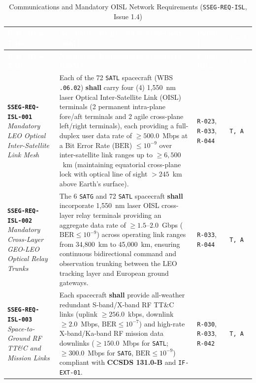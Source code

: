 \documentclass[11pt,a4paper]{article}
\newcommand{\thead}[1]{\textcolor{white}{\textbf{\textsf{#1}}}}
\providecommand{\abbr}[1]{#1}
\begin{document}
{\footnotesize\setlength{\tabcolsep}{4pt}\renewcommand{\arraystretch}{1.15}%
%
%
\setlength{\LTcapwidth}{\textwidth}%
\begin{longtable}{|>{\raggedright\arraybackslash}p{}|>{\raggedright\arraybackslash}p{}|>{\raggedright\arraybackslash}p{}|>{\raggedright\arraybackslash}p{}|}
\caption{Communications and Mandatory OISL Network Requirements (\texttt{SSEG-REQ-ISL}, Issue 1.4)}\label{tab:req_isl_i14}\\
\hline
\rowcolor{TableHeaderBlue}
\thead{Req.\ ID \& Title} & \thead{Normative Requirement Statement (\texttt{shall})} & \thead{Parent Req.} & \thead{Verif.} \\ \hline
\endfirsthead
\hline
\rowcolor{TableHeaderBlue}
\thead{Req.\ ID \& Title} & \thead{Normative Requirement Statement (\texttt{shall})} & \thead{Parent Req.} & \thead{Verif.} \\ \hline
\endhead
\endfoot
\endlastfoot
\textbf{\texttt{SSEG-REQ-ISL-001}} \newline \emph{Mandatory LEO Optical Inter-Satellite Link Mesh} & Each of the 72 \texttt{SATL} spacecraft (\abbr{WBS} \texttt{.06.02}) \textbf{shall} carry four (4) 1,550~nm laser Optical Inter-Satellite Link (\abbr{OISL}) terminals (2 permanent intra-plane fore/aft terminals and 2 agile cross-plane left/right terminals), each providing a full-duplex user data rate of $\ge 500.0$~Mbps at a Bit Error Rate ($\text{BER}$) $\le 10^{-9}$ over inter-satellite link ranges up to $\ge 6{,}500$~km (maintaining equatorial cross-plane lock with optical line of sight $> 245$~km above Earth's surface). & \texttt{R-023}, \texttt{R-033}, \texttt{R-044} & \texttt{T, A} \\ \hline
\textbf{\texttt{SSEG-REQ-ISL-002}} \newline \emph{Mandatory Cross-Layer GEO-LEO Optical Relay Trunks} & The 6 \texttt{SATG} and 72 \texttt{SATL} spacecraft \textbf{shall} incorporate 1,550~nm laser \abbr{OISL} cross-layer relay terminals providing an aggregate data rate of $\ge 1.5\text{--}2.0$~Gbps ($\text{BER} \le 10^{-9}$) across operating link ranges from 34,800~km to 45,000~km, ensuring continuous bidirectional command and observation trunking between the \abbr{LEO} tracking layer and European ground gateways. & \texttt{R-033}, \newline \texttt{R-044} & \texttt{T, A} \\ \hline
\textbf{\texttt{SSEG-REQ-ISL-003}} \newline \emph{Space-to-Ground} \newline \emph{RF TT\&C and Mission Links} & Each spacecraft \textbf{shall} provide all-weather redundant S-band/X-band \abbr{RF} \abbr{TT\&C} links (uplink $\ge 256.0$~kbps, downlink $\ge 2.0$~Mbps, $\text{BER} \le 10^{-7}$) and high-rate X-band/Ka-band \abbr{RF} mission data downlinks ($\ge 150.0$~Mbps for \texttt{SATL}; $\ge 300.0$~Mbps for \texttt{SATG}, $\text{BER} \le 10^{-9}$) compliant with \textbf{CCSDS 131.0-B} and \texttt{IF-EXT-01}. & \texttt{R-030}, \texttt{R-033}, \texttt{R-042} & \texttt{T, A} \\ \hline

\end{longtable}}
\end{document}
